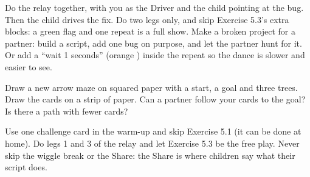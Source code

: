 \begin{differentiation}
\supportpath Do the relay together, with you as the Driver and the child pointing at the bug. Then the child drives the fix. Do two legs only, and skip Exercise 5.3's extra blocks: a green flag and one repeat is a full show.
\extensionpath Make a broken project for a partner: build a script, add one bug on purpose, and let the partner hunt for it. Or add a \enquote{wait 1 seconds} (orange ) inside the repeat so the dance is slower and easier to see.
\end{differentiation}

\begin{stretchchallenge}
Draw a new arrow maze on squared paper with a start, a goal and three trees. Draw the cards on a strip of paper. Can a partner follow your cards to the goal? Is there a path with fewer cards?
\end{stretchchallenge}

\begin{teachernote}
Use one challenge card in the warm-up and skip Exercise 5.1 (it can be done at home). Do legs 1 and 3 of the relay and let Exercise 5.3 be the free play. Never skip the wiggle break or the Share: the Share is where children say what their script does.
\end{teachernote}
